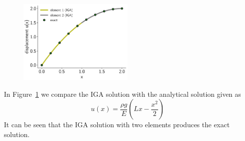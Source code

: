 \documentclass[submit,12pt]{aiaa-pretty} %
\begin{document}
\begin{figure}\label{eqn:bar-solution}
  \centering
  \includegraphics[width=0.5\textwidth]{figures/bar-solution.pdf} \\
\end{figure}
In Figure~\ref{eqn:bar-solution} we compare the IGA solution with the analytical solution given as
\begin{equation}\nonumber
  u(x) = \frac{\rho g}{E} \left( Lx - \frac{x^2}{2}\right)
\end{equation}
It can be seen that the IGA solution with two elements produces the
exact solution.
\end{document}
